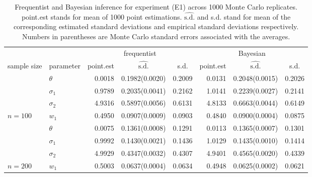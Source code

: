 \begin{table}

\caption{\label{tab:E1tab}Frequentist and Bayesian inference for experiment (E1) across 1000 Monte Carlo replicates. point.est stands for mean of 1000 point estimations. $\widehat{\text{s.d.}}$ and s.d. stand for mean of the corresponding estimated standard deviations and empirical standard deviations respectively. Numbers in parentheses are Monte Carlo standard errors associated with the averages.}
\centering
\begin{tabular}[t]{llrlrrlr}
\toprule
\multicolumn{1}{c}{ } & \multicolumn{1}{c}{ } & \multicolumn{3}{c}{frequentist} & \multicolumn{3}{c}{Bayesian} \\
\cmidrule(l{3pt}r{3pt}){3-5} \cmidrule(l{3pt}r{3pt}){6-8}
\multicolumn{1}{c}{sample size} & \multicolumn{1}{c}{parameter} & \multicolumn{1}{c}{point.est} & \multicolumn{1}{c}{$\widehat{\text{s.d.}}$} & \multicolumn{1}{c}{s.d.} & \multicolumn{1}{c}{point.est} & \multicolumn{1}{c}{$\widehat{\text{s.d.}}$} & \multicolumn{1}{c}{s.d.}\\
\midrule
 & $\theta$ & 0.0018 & 0.1982(0.0020) & 0.2009 & 0.0131 & 0.2048(0.0015) & 0.2026\\
\cmidrule{2-8}
 & $\sigma_1$ & 0.9789 & 0.2035(0.0041) & 0.2162 & 1.0141 & 0.2239(0.0027) & 0.2141\\
\cmidrule{2-8}
 & $\sigma_2$ & 4.9316 & 0.5897(0.0056) & 0.6131 & 4.8133 & 0.6663(0.0044) & 0.6149\\
\cmidrule{2-8}
\multirow{-4}{*}{\raggedright\arraybackslash $n=100$} & $w_1$ & 0.4950 & 0.0907(0.0009) & 0.0903 & 0.4840 & 0.0900(0.0004) & 0.0875\\
\cmidrule{1-8}
 & $\theta$ & 0.0075 & 0.1361(0.0008) & 0.1291 & 0.0113 & 0.1365(0.0007) & 0.1301\\
\cmidrule{2-8}
 & $\sigma_1$ & 0.9992 & 0.1430(0.0021) & 0.1436 & 1.0129 & 0.1435(0.0010) & 0.1414\\
\cmidrule{2-8}
 & $\sigma_2$ & 4.9929 & 0.4347(0.0032) & 0.4307 & 4.9401 & 0.4565(0.0020) & 0.4339\\
\cmidrule{2-8}
\multirow{-4}{*}{\raggedright\arraybackslash $n=200$} & $w_1$ & 0.5003 & 0.0637(0.0004) & 0.0634 & 0.4948 & 0.0625(0.0002) & 0.0621\\
\bottomrule
\end{tabular}
\end{table}
